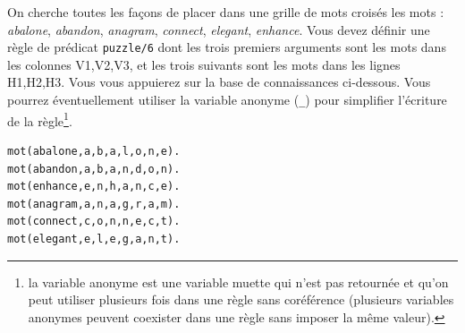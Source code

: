 \documentclass[a4paper]{article}
\begin{document}
\begin{Exercise}[title={Puzzle}]
On cherche toutes les façons de placer dans une grille de mots croisés les
mots : \emph{abalone}, \emph{abandon}, \emph{anagram}, \emph{connect},
\emph{elegant}, \emph{enhance}. Vous devez définir une règle de prédicat 
\verb#puzzle/6# dont les trois premiers arguments sont les mots dans les
colonnes V1,V2,V3, et les trois suivants sont les mots dans les lignes 
H1,H2,H3. Vous vous appuierez sur la base de connaissances ci-­dessous. Vous 
pourrez éventuellement utiliser la variable anonyme (\verb#_#) pour simplifier
l'écriture de la règle\footnote{la variable anonyme est une variable muette
qui n'est pas retournée et qu'on peut utiliser plusieurs fois dans une règle 
sans coréférence (plusieurs variables anonymes peuvent coexister dans une 
règle sans imposer la même valeur).}.

\begin{minipage}{.5\textwidth}
\end{minipage}
\begin{minipage}{.5\textwidth}
\begin{verbatim}
mot(abalone,a,b,a,l,o,n,e).
mot(abandon,a,b,a,n,d,o,n).
mot(enhance,e,n,h,a,n,c,e).
mot(anagram,a,n,a,g,r,a,m).
mot(connect,c,o,n,n,e,c,t).
mot(elegant,e,l,e,g,a,n,t).
\end{verbatim}
\end{minipage}
\end{Exercise}
\end{document}
